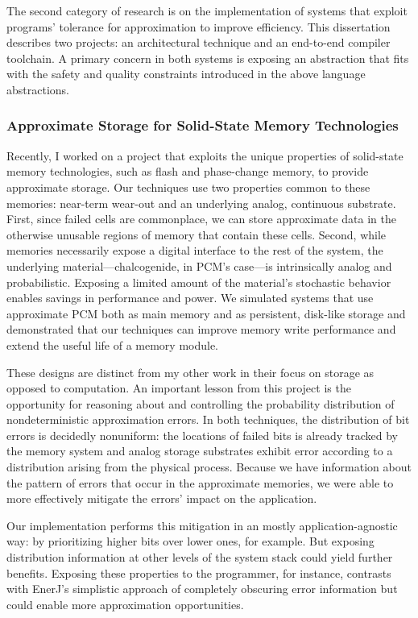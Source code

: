 The second category of research is on the implementation of systems that
exploit programs' tolerance for approximation to improve efficiency.
This dissertation describes two projects: an architectural technique and an
end-to-end compiler toolchain.
A primary concern in both systems is exposing an abstraction that fits with
the safety and quality constraints introduced in the above language
abstractions.

\subsubsection{Approximate Storage for Solid-State Memory Technologies}

Recently, I worked on a project that exploits the unique properties of
solid-state memory technologies, such as flash and phase-change memory,
to provide approximate storage. Our techniques use two properties common to these memories:
near-term wear-out and an underlying analog, continuous substrate. First, since
failed cells are commonplace, we can store approximate data in the otherwise
unusable regions of memory that contain these cells. Second, while memories
necessarily expose a digital interface to the rest of the system, the
underlying material---chalcogenide, in PCM's case---is intrinsically analog
and probabilistic. Exposing a limited amount of the material's stochastic
behavior enables savings in performance and power.
We simulated systems that use approximate PCM both as main memory and as
persistent, disk-like storage and demonstrated that our techniques can improve
memory write performance and extend the useful life of a memory module.

These designs are distinct from my other work in their focus on storage as
opposed to computation. An important lesson from this project is the
opportunity for reasoning about and controlling the probability distribution
of nondeterministic approximation errors. In both techniques, the distribution
of bit errors is decidedly nonuniform: the locations of failed bits is already
tracked by the memory system and analog storage substrates exhibit error
according to a distribution arising from the physical process. Because we have
information about the pattern of errors that occur in the approximate
memories, we were able to more effectively mitigate the errors' impact on the
application.

Our implementation performs this mitigation in an mostly application-agnostic
way: by prioritizing higher bits over lower ones, for example. But exposing
distribution information at other levels of the system stack could yield
further benefits. Exposing these properties to the programmer, for instance,
contrasts with EnerJ's simplistic approach of completely obscuring error
information but could enable more approximation opportunities.

